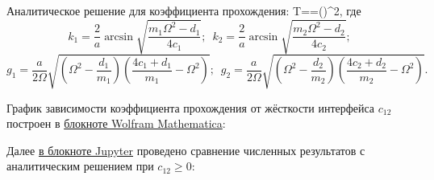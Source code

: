 \documentclass[main.tex]{subfiles}
\begin{document}
Аналитическое решение для коэффициента прохождения:
\beq
T==\left(\right)^2,
\eeq
где
$$
k_1=\frac{2}{a}\arcsin{\sqrt{\frac{m_1\Omega^2-d_1}{4c_1}}};\,\,\,k_2=\frac{2}{a}\arcsin{\sqrt{\frac{m_2\Omega^2-d_2}{4c_2}}};
$$
$$
g_1=\frac{a}{2\Omega}\sqrt{\left(\Omega^2-\frac{d_1}{m_1}\right)\left(\frac{4c_1+d_1}{m_1}-\Omega^2\right)};\,\,\,g_2=\frac{a}{2\Omega}\sqrt{\left(\Omega^2-\frac{d_2}{m_2}\right)\left(\frac{4c_2+d_2}{m_2}-\Omega^2\right)}.
$$

График зависимости коэффициента прохождения от жёсткости интерфейса $c_{12}$ построен в \href{https://github.com/mualal/waves-propagation/blob/master/mathematica/chain-chain-interface.nb}{блокноте Wolfram Mathematica}:

Далее \href{https://github.com/mualal/waves-propagation/blob/master/python/chain-chain-interface.ipynb}{в блокноте Jupyter} проведено сравнение численных результатов с аналитическим решением при $c_{12}\geqslant0$:
\end{document}
